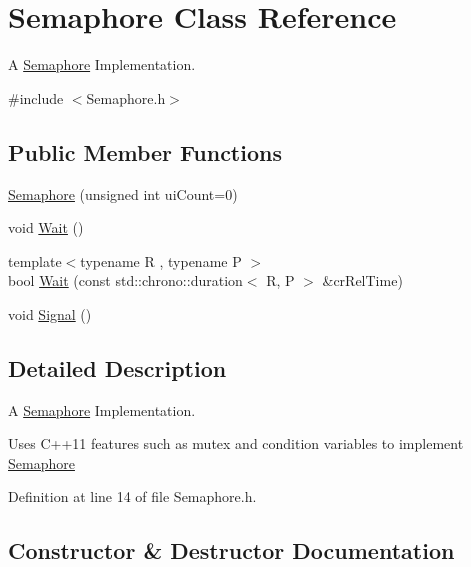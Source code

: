 \hypertarget{class_semaphore}{}\section{Semaphore Class Reference}
\label{class_semaphore}


A \hyperlink{class_semaphore}{Semaphore} Implementation.  




{\ttfamily \#include $<$Semaphore.\+h$>$}

\subsection*{Public Member Functions}
\begin{DoxyCompactItemize}
\item 
\hyperlink{class_semaphore_a0d9290d316636875ca85d1d78950a817}{Semaphore} (unsigned int ui\+Count=0)
\item 
void \hyperlink{class_semaphore_a72aabebf026e3a8b1f3e4d0fa8ee1eda}{Wait} ()
\item 
{\footnotesize template$<$typename R , typename P $>$ }\\bool \hyperlink{class_semaphore_a7f700173ae86ae623684109066e07656}{Wait} (const std\+::chrono\+::duration$<$ R, P $>$ \&cr\+Rel\+Time)
\item 
void \hyperlink{class_semaphore_a86f92f738b4486439b296d8e235895f2}{Signal} ()
\end{DoxyCompactItemize}


\subsection{Detailed Description}
A \hyperlink{class_semaphore}{Semaphore} Implementation. 

Uses C++11 features such as mutex and condition variables to implement \hyperlink{class_semaphore}{Semaphore} 

Definition at line 14 of file Semaphore.\+h.



\subsection{Constructor \& Destructor Documentation}
\mbox{\label{class_semaphore_a0d9290d316636875ca85d1d78950a817}} 
